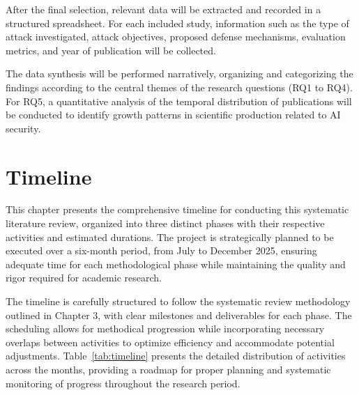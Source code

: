 \documentclass[twoside,brazilian,english]{UNISINOSmonografia}
\begin{document}
After the final selection, relevant data will be extracted and recorded in a structured spreadsheet. For each included study, information such as the type of attack investigated, attack objectives, proposed defense mechanisms, evaluation metrics, and year of publication will be collected.

The data synthesis will be performed narratively, organizing and categorizing the findings according to the central themes of the research questions (RQ1 to RQ4). For RQ5, a quantitative analysis of the temporal distribution of publications will be conducted to identify growth patterns in scientific production related to AI security.




\chapter{Timeline}

This chapter presents the comprehensive timeline for conducting this systematic literature review, organized into three distinct phases with their respective activities and estimated durations. The project is strategically planned to be executed over a six-month period, from July to December 2025, ensuring adequate time for each methodological phase while maintaining the quality and rigor required for academic research.

The timeline is carefully structured to follow the systematic review methodology outlined in Chapter 3, with clear milestones and deliverables for each phase. The scheduling allows for methodical progression while incorporating necessary overlaps between activities to optimize efficiency and accommodate potential adjustments. Table~\ref{tab:timeline} presents the detailed distribution of activities across the months, providing a roadmap for proper planning and systematic monitoring of progress throughout the research period.
\end{document}
